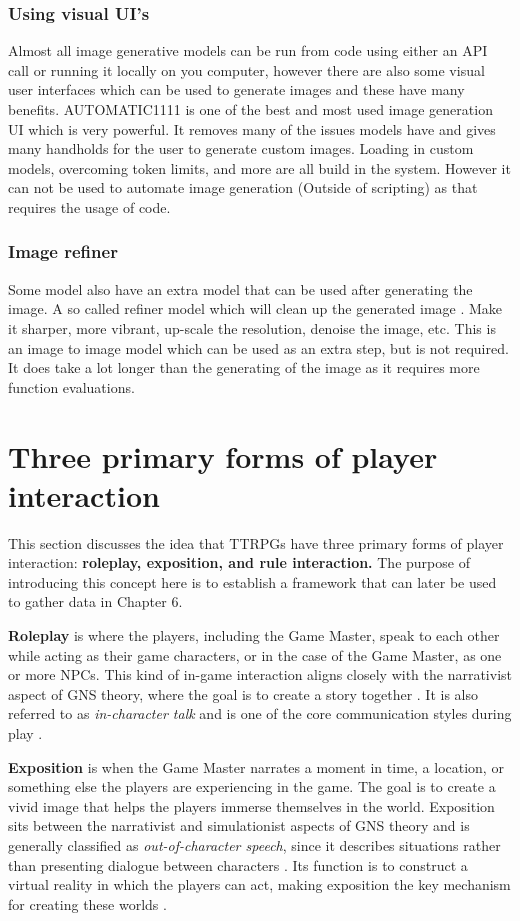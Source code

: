\subsubsection*{Using visual UI's}
 Almost all image generative models can be run from code using either an API call or running it locally on you computer, however there are also some visual user interfaces which can be used to generate images and these have many benefits. AUTOMATIC1111 is one of the best and most used image generation UI which is very powerful. It removes many of the issues models have and gives many handholds for the user to generate custom images. Loading in custom models, overcoming token limits, and more are all build in the system. However it can not be used to automate image generation (Outside of scripting) as that requires the usage of code. 
\subsubsection*{Image refiner}
Some model also have an extra model that can be used after generating the image. A so called refiner model which will clean up the generated image \cite{stabilityai_sdxl_refiner_1}. Make it sharper, more vibrant, up-scale the resolution, denoise the image, etc. This is an image to image model which can be used as an extra step, but is not required. It does take a lot longer than the generating of the image as it requires more function evaluations.

\section{Three primary forms of player interaction} \label{sec:2.6}
This section discusses the idea that TTRPGs have three primary forms of player interaction: \textbf{roleplay, exposition, and rule interaction.} The purpose of introducing this concept here is to establish a framework that can later be used to gather data in Chapter 6.  

\textbf{Roleplay} is where the players, including the Game Master, speak to each other while acting as their game characters, or in the case of the Game Master, as one or more NPCs. This kind of in-game interaction aligns closely with the narrativist aspect of GNS theory, where the goal is to create a story together \cite{edwards2001gns}. It is also referred to as \textit{in-character talk} and is one of the core communication styles during play \cite{bowman2010social, fine1983shared}.  

\textbf{Exposition} is when the Game Master narrates a moment in time, a location, or something else the players are experiencing in the game. The goal is to create a vivid image that helps the players immerse themselves in the world. Exposition sits between the narrativist and simulationist aspects of GNS theory and is generally classified as \textit{out-of-character speech}, since it describes situations rather than presenting dialogue between characters \cite{bowman2010social}. Its function is to construct a virtual reality in which the players can act, making exposition the key mechanism for creating these worlds \cite{ryan2001narrative}.  

